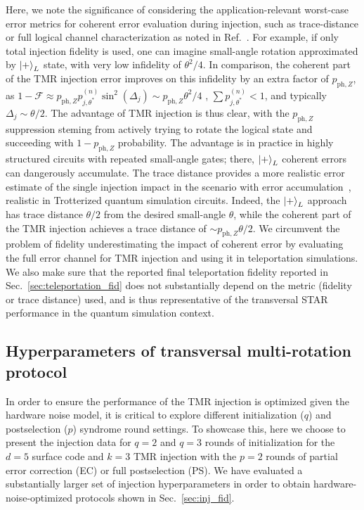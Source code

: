 \documentclass[aps, prx, reprint, superscriptaddress, longbibliography, floatfix]{revtex4-2}
\begin{document}
Here, we note the significance of considering the application-relevant worst-case error metrics for coherent error evaluation during injection, such as trace-distance or full logical channel characterization as noted in Ref.~\cite{Toshio2024}. For example, if only total injection fidelity is used, one can imagine small-angle rotation approximated by $\ket{+}_L$ state, with very low infidelity of $\theta^2/4$. In comparison, the coherent part of the TMR injection error improves on this infidelity by an extra factor of $p_{\mathrm{ph}, Z}$, as $1-\mathcal{F}\approx p_{\mathrm{ph},Z}p^{(n)}_{j,\theta^*}\sin^2(\Delta_j)\sim p_{\mathrm{ph}, Z} \theta^2/4$ , $\sum p^{(n)}_{j,\theta^*}<1$, and typically $\Delta_j\sim \theta/2$. The advantage of TMR injection is thus clear, with the $p_{\mathrm{ph},Z}$ suppression steming from actively trying to rotate the logical state and succeeding with $1-p_{\mathrm{ph},Z}$ probability. The advantage is in practice in highly structured circuits with repeated small-angle gates; there, $\ket{+}_L$ coherent errors can dangerously accumulate.  The trace distance provides a more realistic error estimate of the single injection impact in the scenario with error accumulation~\cite{Toshio2024}, realistic in Trotterized quantum simulation circuits. Indeed, the $\ket{+}_L$ approach has trace distance $\theta/2$ from the desired small-angle $\theta$, while the coherent part of the TMR injection achieves a trace distance of $\sim p_{\mathrm{ph}, Z} \theta/2$. We circumvent the problem of fidelity underestimating the impact of coherent error by evaluating the full error channel for TMR injection and using it in teleportation simulations. We also make sure that the reported final teleportation fidelity reported in Sec.~\ref{sec:teleportation_fid} does not substantially depend on the metric (fidelity or trace distance) used, and is thus representative of the transversal STAR performance in the quantum simulation context.

\subsection{Hyperparameters of transversal multi-rotation protocol}
\label{app:hyperparameters_TMR}

In order to ensure the performance of the TMR injection is optimized given the hardware noise model, it is critical to explore different initialization ($q$) and postselection ($p$) syndrome round settings. To showcase this, here we choose to present the injection data for $q=2$ and $q=3$ rounds of initialization for the $d=5$ surface code and $k=3$ TMR injection with the $p=2$ rounds of partial error correction (EC) or full postselection (PS). We have evaluated a substantially larger set of injection hyperparameters in order to obtain hardware-noise-optimized protocols shown in Sec.~\ref{sec:inj_fid}.
\end{document}
